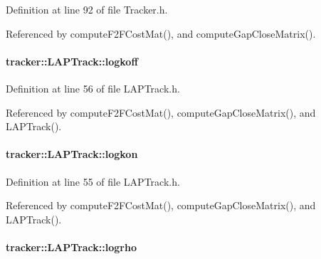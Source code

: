 Definition at line 92 of file Tracker.\+h.



Referenced by compute\+F2\+F\+Cost\+Mat(), and compute\+Gap\+Close\+Matrix().

\paragraph[{\texorpdfstring{logkoff}{logkoff}}]{ tracker\+::\+L\+A\+P\+Track\+::logkoff\hspace{0.3cm}{\ttfamily [protected]}}\hypertarget{classtracker_1_1LAPTrack_a75af05f0cad86fd46bcb32ac63e36abb}{}\label{classtracker_1_1LAPTrack_a75af05f0cad86fd46bcb32ac63e36abb}


Definition at line 56 of file L\+A\+P\+Track.\+h.



Referenced by compute\+F2\+F\+Cost\+Mat(), compute\+Gap\+Close\+Matrix(), and L\+A\+P\+Track().

\paragraph[{\texorpdfstring{logkon}{logkon}}]{ tracker\+::\+L\+A\+P\+Track\+::logkon\hspace{0.3cm}{\ttfamily [protected]}}\hypertarget{classtracker_1_1LAPTrack_ac257b647714df10faf5c3bc15ae9ed43}{}\label{classtracker_1_1LAPTrack_ac257b647714df10faf5c3bc15ae9ed43}


Definition at line 55 of file L\+A\+P\+Track.\+h.



Referenced by compute\+F2\+F\+Cost\+Mat(), compute\+Gap\+Close\+Matrix(), and L\+A\+P\+Track().

\paragraph[{\texorpdfstring{logrho}{logrho}}]{ tracker\+::\+L\+A\+P\+Track\+::logrho\hspace{0.3cm}{\ttfamily [protected]}}\hypertarget{classtracker_1_1LAPTrack_a95e4746d8eac4e665e0bb34be5ad4198}{}\label{classtracker_1_1LAPTrack_a95e4746d8eac4e665e0bb34be5ad4198}


